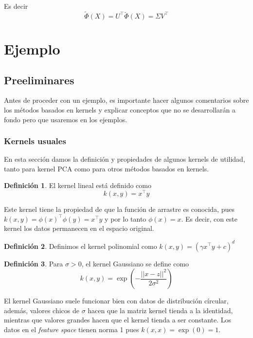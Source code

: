 \documentclass{article}
\numberwithin{equation}{section}
\theoremstyle{remark}
\theoremstyle{definition}
\newtheorem{definition}{Definición}
\theoremstyle{remark}
\theoremstyle{remark}
\begin{document}
Es decir
\begin{equation}
    \label{eq:kpca_projection}
    \tilde{\Phi}(X) = U^\intercal \breve{\Phi}(X) = \Sigma V^\intercal
\end{equation}

\pagebreak
\section{Ejemplo}
\subsection{Preeliminares}
Antes de proceder con un ejemplo, es importante hacer algunos comentarios sobre los métodos basados en kernels
y explicar conceptos que no se desarrollarán a fondo pero que usaremos en los ejemplos.

\subsubsection{Kernels usuales}
En esta sección damos la definición y propiedades de algunos kernels de utilidad, tanto para kernel PCA como
para otros métodos basados en kernels.

\begin{definition}
   El kernel lineal está definido como 
   $$k(x,y) = x^\intercal y$$ 
\end{definition}
Este kernel tiene la propiedad de que la función de arrastre es conocida, pues 
$k(x,y) = \phi(x)^\intercal \phi(y) = x^\intercal y$ y por lo tanto $\phi(x) = x$. Es decir, con este
kernel los datos permanecen en el espacio original.

\begin{definition}
    Definimos el kernel polinomial como
    $k(x,y) = (\gamma x^\intercal y + c)^d$
\end{definition}

\begin{definition}
    Para $\sigma > 0$, el kernel Gaussiano se define como 
    $$k(x,y) = \exp\left ( {-\frac{||x - z||^2}{2\sigma^2}} \right )$$
\end{definition}

El kernel Gaussiano suele funcionar bien con datos de distribución círcular, además, 
valores chicos de $\sigma$ hacen que la matriz kernel tienda a la identidad, mientras que 
valores grandes hacen que el kernel tienda a ser constante.
Los datos en el \textit{feature space} tienen norma 1 pues $k(x,x) = \exp(0) = 1$.
\end{document}
